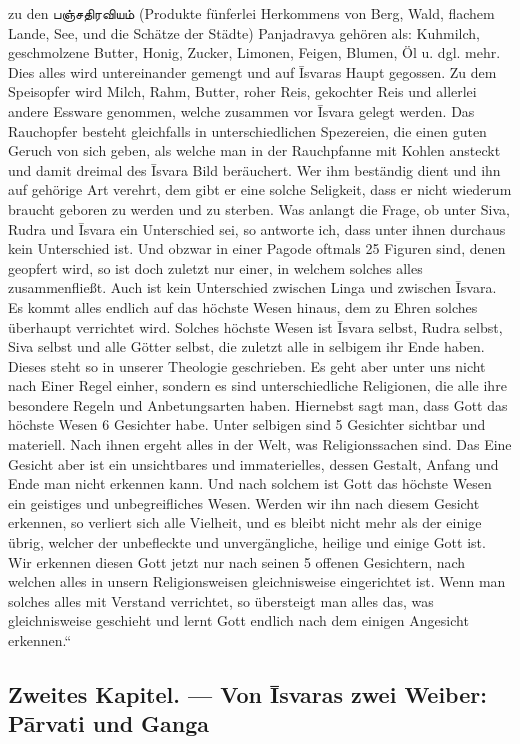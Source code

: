 \documentclass{article}
\newcommand{\TamilText}[1]{\texttamil{#1}}
\newcommand{\tam}[1]{\TamilText{#1}}
\begin{document}
zu den \tam{பஞ்சதிரவியம்} (Produkte fünferlei Herkommens von Berg, Wald, flachem Lande, See, und die Schätze der Städte) Panjadravya gehören als: Kuhmilch, geschmolzene Butter, Honig, Zucker, Limonen, Feigen, Blumen, Öl u. dgl. mehr. Dies alles wird untereinander gemengt und auf \={I}svaras Haupt gegossen. Zu dem Speisopfer wird Milch, Rahm, Butter, roher Reis, gekochter Reis und allerlei andere Essware genommen, welche zusammen vor \={I}svara gelegt werden. Das Rauchopfer besteht gleichfalls in unterschiedlichen Spezereien, die einen guten Geruch von sich geben, als welche man in der Rauchpfanne mit Kohlen ansteckt und damit dreimal des \={I}svara Bild beräuchert. Wer ihm beständig dient und ihn auf gehörige Art verehrt, dem gibt er eine solche Seligkeit, dass er nicht wiederum braucht geboren zu werden und zu sterben. Was anlangt die Frage, ob unter Siva, Rudra und \={I}svara ein Unterschied sei, so antworte ich, dass unter ihnen durchaus kein Unterschied ist. Und obzwar in einer Pagode oftmals 25 Figuren sind, denen geopfert wird, so ist doch zuletzt nur einer, in welchem solches alles zusammenfließt. Auch ist kein Unterschied zwischen Linga und zwischen \={I}svara. Es kommt alles endlich auf das höchste Wesen hinaus, dem zu Ehren solches überhaupt verrichtet wird. Solches höchste Wesen ist \={I}svara selbst, Rudra selbst, Siva selbst und alle Götter selbst, die zuletzt alle in selbigem ihr Ende haben. Dieses steht so in unserer Theologie geschrieben. Es geht aber unter uns nicht nach Einer Regel einher, sondern es sind unterschiedliche Religionen, die alle ihre besondere Regeln und Anbetungsarten haben. Hiernebst sagt man, dass Gott das höchste Wesen 6 Gesichter habe. Unter selbigen sind 5 Gesichter sichtbar und materiell. Nach ihnen ergeht alles in der Welt, was Religionssachen sind. Das Eine Gesicht aber ist ein unsichtbares und immaterielles, dessen Gestalt, Anfang und Ende man nicht erkennen kann. Und nach solchem ist Gott das höchste Wesen ein geistiges und unbegreifliches Wesen. Werden wir ihn nach diesem Gesicht erkennen, so verliert sich alle Vielheit, und es bleibt nicht mehr als der einige übrig, welcher der unbefleckte und unvergängliche, heilige und einige Gott ist. Wir erkennen diesen Gott jetzt nur nach seinen 5 offenen Gesichtern, nach welchen alles in unsern Religionsweisen gleichnisweise eingerichtet ist. Wenn man solches alles mit Verstand verrichtet, so übersteigt man alles das, was gleichnisweise geschieht und lernt Gott endlich nach dem einigen Angesicht erkennen.“
\clearpage
\subsection{Zweites Kapitel. — Von \={I}svaras zwei Weiber: P\={a}rvati und Ganga}
\end{document}
